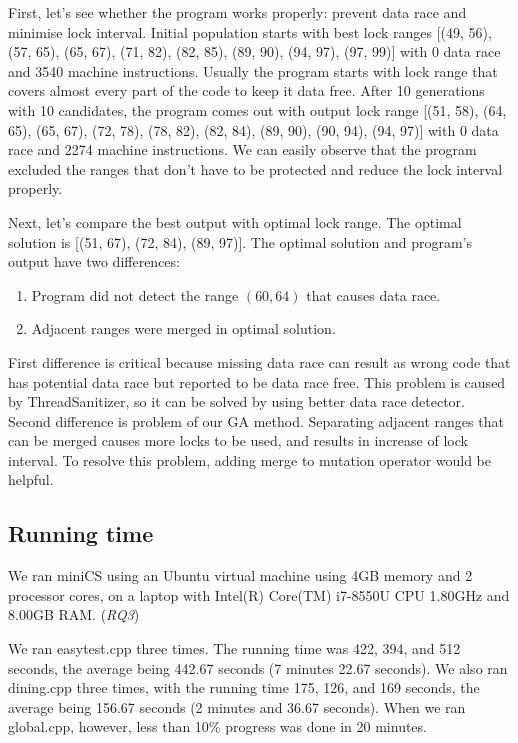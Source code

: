 First, let's see whether the program works properly: prevent data race and minimise lock interval. Initial population starts with best lock ranges [(49, 56), (57, 65), (65, 67), (71, 82), (82, 85), (89, 90), (94, 97), (97, 99)] with 0 data race and 3540 machine instructions. Usually the program starts with lock range that covers almost every part of the code to keep it data free. After 10 generations with 10 candidates, the program comes out with output lock range [(51, 58), (64, 65), (65, 67), (72, 78), (78, 82), (82, 84), (89, 90), (90, 94), (94, 97)] with 0 data race and 2274 machine instructions. We can easily observe that the program excluded the ranges that don't have to be protected and reduce the lock interval properly. 

Next, let's compare the best output with optimal lock range. The optimal solution is [(51, 67), (72, 84), (89, 97)]. The optimal solution and program's output have two differences:

\begin{enumerate}
    \item Program did not detect the range $(60, 64)$ that causes data race.
    \item Adjacent ranges were merged in optimal solution.
\end{enumerate}

First difference is critical because missing data race can result as wrong code that has potential data race but reported to be data race free. This problem is caused by ThreadSanitizer, so it can be solved by using better data race detector. Second difference is problem of our GA method. Separating adjacent ranges that can be merged causes more locks to be used, and results in increase of lock interval. To resolve this problem, adding merge to mutation operator would be helpful.

\subsection{Running time}

We ran miniCS using an Ubuntu virtual machine using 4GB memory and 2 processor cores, on a laptop with Intel(R) Core(TM) i7-8550U CPU 1.80GHz and 8.00GB RAM. (\textit{RQ3})

We ran easytest.cpp three times. The running time was 422, 394, and 512 seconds, the average being 442.67 seconds (7 minutes 22.67 seconds). We also ran dining.cpp three times, with the running time 175, 126, and 169 seconds, the average being 156.67 seconds (2 minutes and 36.67 seconds). When we ran global.cpp, however, less than 10\% progress was done in 20 minutes.

